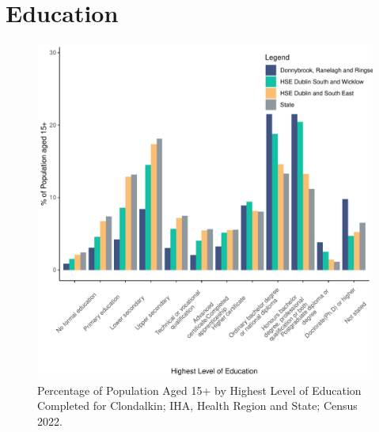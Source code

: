 \documentclass{article}
\begin{document}
\section{Education}\label{sect:Edu}
\begin{figure}[H]
	\centering
	\includegraphics[width = 120mm]{../figures/EduED.pdf}
	\caption{Percentage of Population Aged 15+ by Highest Level of Education Completed for Clondalkin; IHA, Health Region and State; Census 2022.}
	\label{fig:vbnv}
	\end{figure}
\end{document}

